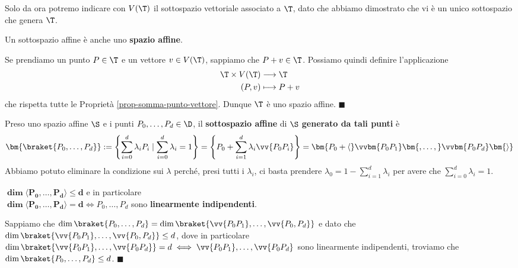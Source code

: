 \documentclass[11pt, a4paper, titlepage, oneside]{scrbook}
\begin{document}
\NB Solo da ora potremo indicare con $V(\T)$ il sottospazio vettoriale associato a $\T$, dato che abbiamo dimostrato che vi è un unico sottospazio che genera $\T$.

\begin{Proposizione}[]
\label{propos-sottospazio-affine-spazio}
Un sottospazio affine è anche uno \textbf{spazio affine}.
\end{Proposizione}

\Dimostrazione \nopagebreak

Se prendiamo un punto $P \in \T$ e un vettore $v \in V(\T)$, sappiamo che $P + v \in \T$. Possiamo quindi definire l'applicazione
\begin{align*}
\T \times V(\T) &\longrightarrow \T \\
(P,v) &\longmapsto P + v 
\end{align*} 
che rispetta tutte le Proprietà \ref{prop-somma-punto-vettore}. Dunque $\T$ è uno spazio affine. $\blacksquare$

\begin{Definizione}
\label{def-sottospazio-affine-generato}
Preso uno spazio affine $\S$ e i punti $P_0, \ldots, P_d \in \D$, il \textbf{sottospazio affine} di $\S$ \textbf{generato da tali punti} è 
\[\bm{\braket{P_0,\ldots,P_d}} := \left\{\sum_{i = 0}^d \lambda_i P_i \mid \sum_{i = 0}^d \lambda_i = 1\right\} = \left\{P_0 + \sum_{i = 1}^d \lambda_i \vv{P_0P_i}\right\} = \bm{P_0 + \langle} \vvbm{P_0P_1}\bm{,\ldots,} \vvbm{P_0P_d} \bm{\rangle}\] 
\NB Abbiamo potuto eliminare la condizione sui $\lambda$ perché, presi tutti i $\lambda_i$, ci basta prendere $\lambda_0 = 1 - \sum_{i = 1}^d \lambda_i$ per avere che $\sum_{i = 0}^d \lambda_i = 1$.
\end{Definizione}

\begin{Osservazione}[]
\label{oss-dimensione-sottospazio-affine-generato}
$\bm{\dim \langle P_0,\ldots,P_d \rangle \leq d}$ e in particolare \\ $\bm{\dim \langle P_0,\ldots,P_d \rangle = d} \iff P_0,\ldots,P_d$ sono \textbf{linearmente indipendenti}.
\end{Osservazione}

\Dimostrazione \nopagebreak

Sappiamo che $\dim \braket{P_0,\ldots,P_d} = \dim \braket{\vv{P_0P_1}, \ldots, \vv{P_0,P_d}}$ e dato che $\dim \braket{\vv{P_0P_1}, \ldots, \vv{P_0,P_d}} \leq d$, dove in particolare $\dim \braket{\vv{P_0P_1}, \ldots, \vv{P_0P_d}} = d \iff \vv{P_0P_1}, \ldots, \vv{P_0P_d}$ sono linearmente indipendenti, troviamo che $\dim \braket{P_0, \ldots, P_d} \leq d$. $\blacksquare$
\end{document}
